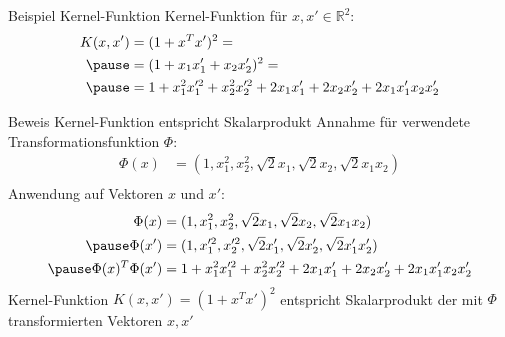 \documentclass[ngerman]{beamer}
\begin{document}
\begin{frame}{Beispiel Kernel-Funktion}
    Kernel-Funktion für $x, x' \in \mathbb{R}^2$: \\
    \begin{equation*} \label{eq:example1_kernel_pres}
    \begin{aligned}
        K(x, x') &= (1 + x^{T}x')^{2} = \\ \pause
        &= (1 + x_{1} x_{1}' + x_{2} x_{2}')^{2} = \\ \pause
        &= 1 + x_{1}^2 x_{1}'^2 + x_{2}^{2} x_{2}'^{2} + 2x_{1} x_{1}' + 2 x_{2} x_{2}' + 2 x_{1} x_{1}'x_{2} x_{2}'
    \end{aligned}
    \end{equation*}
\end{frame}

\begin{frame}{Beweis Kernel-Funktion entspricht Skalarprodukt}
    Annahme für verwendete Transformationsfunktion $\Phi$: \\
    \begin{equation*}
        \begin{aligned}
            \Phi(x) &= (1, x_{1}^{2}, x_{2}^{2}, \sqrt{2} x_{1}, \sqrt{2} x_{2}, \sqrt{2} x_{1} x_{2})\\
        \end{aligned}
    \end{equation*}
    Anwendung auf Vektoren $x$ und $x'$: \\ \pause
    \begin{equation*} \label{eq:example1_innerprod_pres}
    \begin{aligned}
        \Phi(x) &= (1, x_{1}^{2}, x_{2}^{2}, \sqrt{2} x_{1}, \sqrt{2} x_{2}, \sqrt{2} x_{1} x_{2})\\ \pause
        \Phi(x') &= (1, x_{1}'^{2}, x_{2}'^{2}, \sqrt{2} x_{1}', \sqrt{2} x_{2}', \sqrt{2} x_{1}' x_{2}')\\ \pause
        \Phi(x)^T \Phi(x') &= 1 + x_{1}^2 x_{1}'^2 + x_{2}^{2} x_{2}'^{2} + 2x_{1} x_{1}' + 2 x_{2} x_{2}' + 2 x_{1} x_{1}'x_{2} x_{2}'
    \end{aligned}
    \end{equation*} \pause
    Kernel-Funktion $K(x, x') = (1 + x^{T}x')^{2}$ entspricht Skalarprodukt der mit $\Phi$ transformierten Vektoren $x, x'$
\end{frame}
\end{document}
